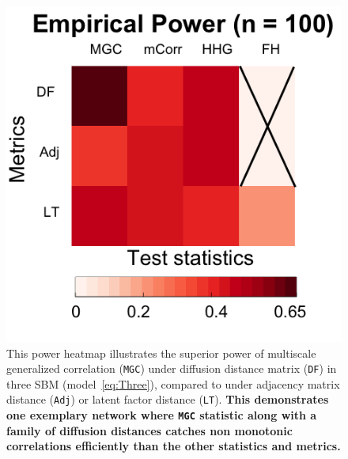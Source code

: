 \documentclass[12pt]{article}
\theoremstyle{definition}
\begin{document}
\begin{figure}
	\centering
	\includegraphics[width=0.4\paperwidth, height=0.4\paperwidth]{../Figure/ThreeSBM_results_simple.png}
	\caption{This power heatmap illustrates the superior power of multiscale generalized correlation (\texttt{MGC}) under diffusion distance matrix (\texttt{DF}) in three SBM (model~\ref{eq:Three}), compared to under adjacency matrix distance (\texttt{Adj}) or latent factor distance (\texttt{LT}). \textbf{This demonstrates one exemplary network where \texttt{MGC} statistic along with a family of diffusion distances catches non monotonic correlations efficiently than the other statistics and metrics.}}
	\label{fig:threeSBM}
\end{figure}
\end{document}
